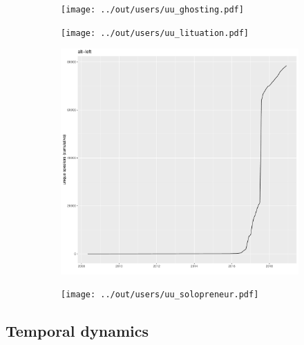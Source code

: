 \documentclass[a4paper]{scrartcl}
\begin{document}
    \begin{figure}[H]
      \caption{Cumulative frequency counts for case study words.}
      \centering
      \begin{subfigure}{.45\linewidth}
        \caption{}
        \centering
        \texttt{[image: ../out/users/uu\_ghosting.pdf]}
      \end{subfigure}
      \begin{subfigure}{.45\linewidth}
        \caption{}
        \centering
        \texttt{[image: ../out/users/uu\_lituation.pdf]}
      \end{subfigure}

      \begin{subfigure}{.45\linewidth}
        \caption{}
        \centering
        \includegraphics[width=\linewidth, height=.8\textheight, keepaspectratio]{../out/users/uu_alt-left.pdf}
      \end{subfigure}
      \begin{subfigure}{.45\linewidth}
        \caption{}
        \centering
        \texttt{[image: ../out/users/uu\_solopreneur.pdf]}
      \end{subfigure}
    \end{figure}

  \subsection{Temporal dynamics}
\end{document}
